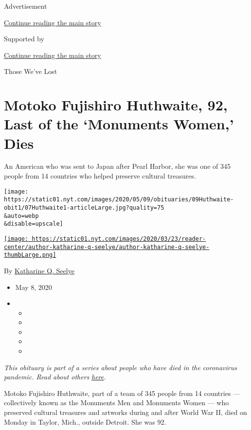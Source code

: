Advertisement

\protect\hyperlink{after-top}{Continue reading the main story}

Supported by

\protect\hyperlink{after-sponsor}{Continue reading the main story}

Those We've Lost

\hypertarget{motoko-fujishiro-huthwaite-92-last-of-the-monuments-women-dies}{%
\section{Motoko Fujishiro Huthwaite, 92, Last of the `Monuments Women,'
Dies}\label{motoko-fujishiro-huthwaite-92-last-of-the-monuments-women-dies}}

An American who was sent to Japan after Pearl Harbor, she was one of 345
people from 14 countries who helped preserve cultural treasures.

\texttt{[image: https://static01.nyt.com/images/2020/05/09/obituaries/09Huthwaite-obit1/07Huthwaite1-articleLarge.jpg?quality=75\\\&auto=webp\\\&disable=upscale]}

\href{https://www.nytimes.com/by/katharine-q-seelye}{\texttt{[image: https://static01.nyt.com/images/2020/03/23/reader-center/author-katharine-q-seelye/author-katharine-q-seelye-thumbLarge.png]}}

By \href{https://www.nytimes.com/by/katharine-q-seelye}{Katharine Q.
Seelye}

\begin{itemize}
\item
  May 8, 2020
\item
  \begin{itemize}
  \item
  \item
  \item
  \item
  \item
  \end{itemize}
\end{itemize}

\emph{This obituary is part of a series about people who have died in
the coronavirus pandemic. Read about others}
\href{https://www.nytimes.com/series/people-who-have-died-of-the-coronavirus}{\emph{here}}\emph{.}

Motoko Fujishiro Huthwaite, part of a team of 345 people from 14
countries --- collectively known as the Monuments Men and Monuments
Women --- who preserved cultural treasures and artworks during and after
World War II, died on Monday in Taylor, Mich., outside Detroit. She was
92.

